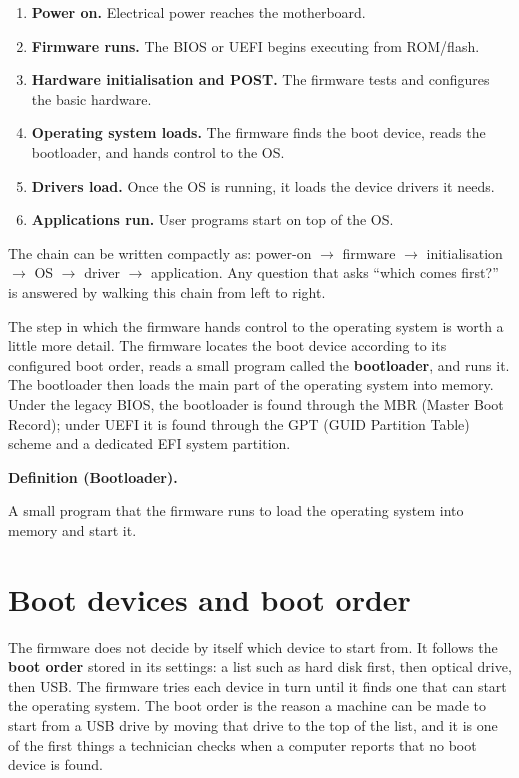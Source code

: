 \documentclass[11pt]{article}
\newenvironment{definitionbox}[1]{%
  \par\noindent\textbf{Definition (#1).}\ \itshape
}{\par\vspace{0.3em}}
\begin{document}
\begin{enumerate}
  \item \textbf{Power on.} Electrical power reaches the motherboard.
  \item \textbf{Firmware runs.} The BIOS or UEFI begins executing from
    ROM/flash.
  \item \textbf{Hardware initialisation and POST.} The firmware tests and
    configures the basic hardware.
  \item \textbf{Operating system loads.} The firmware finds the boot device,
    reads the bootloader, and hands control to the OS.
  \item \textbf{Drivers load.} Once the OS is running, it loads the device
    drivers it needs.
  \item \textbf{Applications run.} User programs start on top of the OS.
\end{enumerate}

The chain can be written compactly as: power-on $\rightarrow$ firmware
$\rightarrow$ initialisation $\rightarrow$ OS $\rightarrow$ driver
$\rightarrow$ application. Any question that asks ``which comes first?'' is
answered by walking this chain from left to right.

The step in which the firmware hands control to the operating system is worth
a little more detail. The firmware locates the boot device according to its
configured boot order, reads a small program called the
\textbf{bootloader}, and runs it. The bootloader then loads the main part of
the operating system into memory. Under the legacy BIOS, the bootloader is
found through the MBR (Master Boot Record); under UEFI it is found through
the GPT (GUID Partition Table) scheme and a dedicated EFI system partition.

\begin{definitionbox}{Bootloader}
A small program that the firmware runs to load the operating system into
memory and start it.
\end{definitionbox}

\section{Boot devices and boot order}
The firmware does not decide by itself which device to start from. It follows
the \textbf{boot order} stored in its settings: a list such as hard disk
first, then optical drive, then USB. The firmware tries each device in turn
until it finds one that can start the operating system. The boot order is the
reason a machine can be made to start from a USB drive by moving that drive
to the top of the list, and it is one of the first things a technician checks
when a computer reports that no boot device is found.
\end{document}

